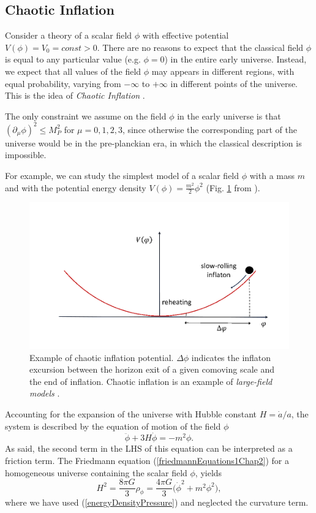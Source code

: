 \documentclass[11pt,a4paper,twoside]{book}
\begin{document}
\subsection{Chaotic Inflation}
Consider a theory of a scalar field $\phi$ with effective potential $ V(\phi)=V_{0} = const > 0$. There are no reasons to expect that the classical field $\phi$ is equal to any particular value (e.g. $\phi = 0$) in the entire early universe. Instead, we expect that all values of the field $\phi$ may appears in different regions, with equal probability, varying from  $ -\infty $ to $ +\infty $ in different points of the universe. This is the idea of  \textit{Chaotic Inflation} \cite{ChaoticInflationLinde:Chap2}.

The only constraint we assume on the field $\phi$ in the early universe is that $ (\partial_{\mu} \phi)^{2} \le M_{P}^{2} $ for $ \mu = 0,1,2,3 $, since otherwise the corresponding part of the universe would be in the pre-planckian era, in which the classical description is impossible.

For example, we can study the simplest model of a scalar field $\phi$ with a mass $ m $ and with the potential energy density $ V(\phi) = \frac{m^{2}}{2}\phi^{2} $ (Fig. \ref{fig:chaoticinflationgwfrominflationfig3} from \cite{GWFromInflation:Intro}).
\begin{figure}
	\centering
	\includegraphics[width=0.55\linewidth, height=0.24\textheight]{Images/Chap2/ChaoticInflation_GWFromInflation_Fig3}
	\caption{Example of chaotic inflation potential. $ \Delta \phi $  indicates the inflaton excursion between the horizon exit of a given comoving scale and the end of inflation. Chaotic inflation is an example of \textit{large-field models} \cite{GWFromInflation:Intro}.}
	\label{fig:chaoticinflationgwfrominflationfig3}
\end{figure}
 Accounting for the expansion of the universe with Hubble constant $ H=\dot{a}/a $, the system is described by the equation of motion of the field $\phi$
\begin{equation}
	\label{Chap2eomChaoticInflation}
	\ddot{\phi} + 3H\dot{\phi} = -m^{2}\phi. 
\end{equation}
As said, the second term in the LHS of this equation can be interpreted as a friction term. The Friedmann equation (\ref{friedmannEquations1Chap2}) for a homogeneous universe containing the scalar field $\phi$, yields
\begin{equation}
	\label{Chap2:friedmannChaoticInflation}
	H^{2}=\frac{8 \pi G}{3}\rho_{\phi}= \frac{4 \pi G}{3}\Big (\dot{\phi}^{2} + m^{2}\phi^{2} \Big ),
\end{equation}
where we have used (\ref{energyDensityPressure}) and neglected the curvature term.
\end{document}
